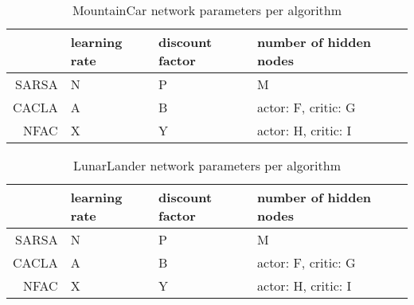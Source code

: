 \begin{table}
\centering
\label{tab:mntparam}
\begin{tabular}{r|llll}
                     & learning rate & discount factor & number of hidden nodes \\\hline
SARSA & N          & P               & M         \\
CACLA & A          & B               & actor: F, critic: G         \\
NFAC    & X          & Y              & actor: H, critic: I        
\end{tabular}
\caption{MountainCar network parameters per algorithm}
\end{table}

\begin{table}
\centering
\label{tab:lunarparam}
\begin{tabular}{r|llll}
                     & learning rate & discount factor & number of hidden nodes \\\hline
SARSA & N          & P               & M         \\
CACLA & A          & B               & actor: F, critic: G         \\
NFAC    & X          & Y              & actor: H, critic: I        
\end{tabular}
\caption{LunarLander network parameters per algorithm}
\end{table}

